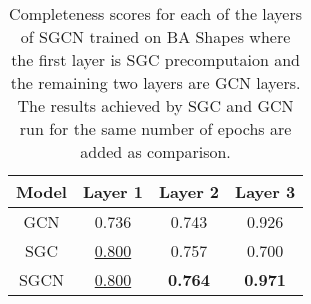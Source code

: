 \begin{table}[h]
    \centering
    \captionsetup{width=.9\textwidth}
    \begin{tabular}{c|c|cc}
        \textbf{Model} & \textbf{Layer 1} & \textbf{Layer 2} & \textbf{Layer 3} \\
        \midrule
        GCN     & 0.736 & 0.743 & 0.926 \\
        SGC     & \underline{0.800} & 0.757 & 0.700 \\
        \midrule
        SGCN    & \underline{0.800} & \textbf{0.764} & \textbf{0.971} \\
    \end{tabular}
    \caption{Completeness scores for each of the layers of SGCN trained on BA Shapes where the first layer is SGC precomputaion and the remaining two layers are GCN layers. The results achieved by SGC and GCN run for the same number of epochs are added as comparison.}
    \label{tab:SGCN-completeness}
\end{table}

